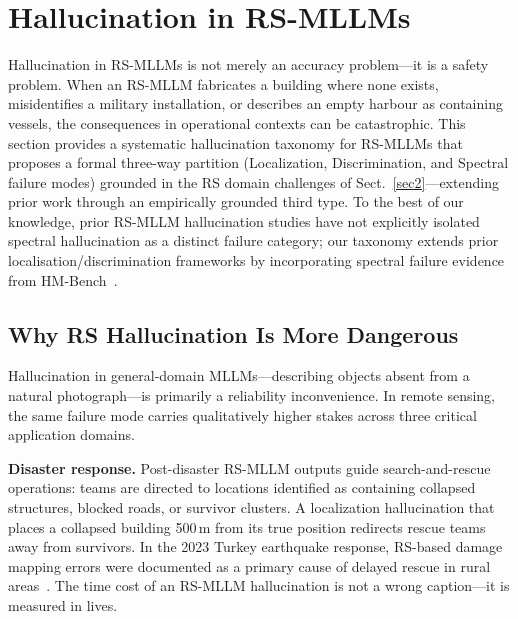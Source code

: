 
\section{Hallucination in RS-MLLMs}\label{sec7}

Hallucination in RS-MLLMs is not merely an accuracy problem---it is a safety
problem. When an RS-MLLM fabricates a building where none exists, misidentifies
a military installation, or describes an empty harbour as containing vessels, the
consequences in operational contexts can be catastrophic. This section provides
a systematic hallucination taxonomy for RS-MLLMs that proposes a formal three-way
partition (Localization, Discrimination, and Spectral failure modes) grounded in
the RS domain challenges of Sect.~\ref{sec2}---extending prior work through an
empirically grounded third type. To the best of our knowledge, prior RS-MLLM
hallucination studies have not explicitly isolated spectral hallucination as a
distinct failure category; our taxonomy extends prior localisation/discrimination
frameworks by incorporating spectral failure evidence from HM-Bench~\cite{hmbench2026}.

\subsection{Why RS Hallucination Is More Dangerous}\label{sec7:danger}

Hallucination in general-domain MLLMs---describing objects absent from a
natural photograph---is primarily a reliability inconvenience. In remote sensing,
the same failure mode carries qualitatively higher stakes across three critical
application domains.

\textbf{Disaster response.}
Post-disaster RS-MLLM outputs guide search-and-rescue operations: teams are
directed to locations identified as containing collapsed structures, blocked
roads, or survivor clusters. A localization hallucination that places a
collapsed building 500\,m from its true position redirects rescue teams away
from survivors. In the 2023 Turkey earthquake response, RS-based damage mapping
errors were documented as a primary cause of delayed rescue in rural
areas~\cite{long2021creating}. The time cost of an RS-MLLM hallucination is
not a wrong caption---it is measured in lives.

